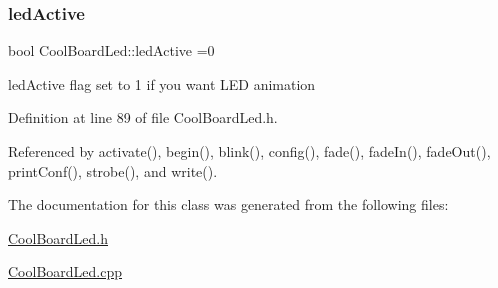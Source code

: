 \subsubsection{\texorpdfstring{led\+Active}{ledActive}}
{\footnotesize\ttfamily bool Cool\+Board\+Led\+::led\+Active =0\hspace{0.3cm}{\ttfamily [private]}}

led\+Active flag set to 1 if you want L\+ED animation 

Definition at line 89 of file Cool\+Board\+Led.\+h.



Referenced by activate(), begin(), blink(), config(), fade(), fade\+In(), fade\+Out(), print\+Conf(), strobe(), and write().



The documentation for this class was generated from the following files\+:\begin{DoxyCompactItemize}
\item 
\hyperlink{_cool_board_led_8h}{Cool\+Board\+Led.\+h}\item 
\hyperlink{_cool_board_led_8cpp}{Cool\+Board\+Led.\+cpp}\end{DoxyCompactItemize}
